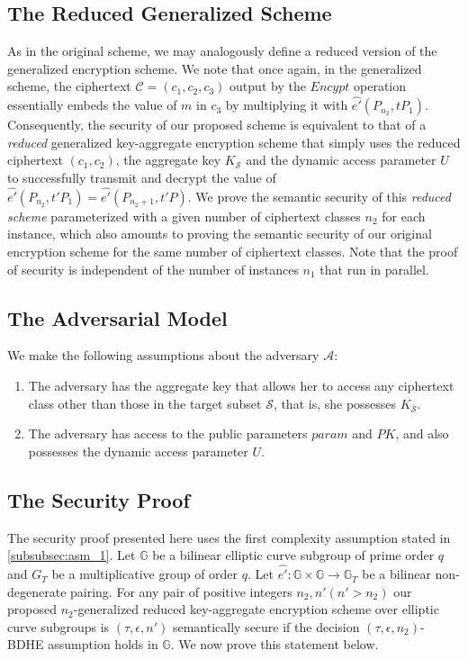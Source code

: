 \subsection{The Reduced Generalized Scheme}

As in the original scheme, we may analogously define a reduced version of the generalized encryption scheme. We note that once again, in the generalized scheme, the ciphertext $\mathcal{C}=(c_1,c_2,c_3)$ output by the $Encypt$ operation essentially embeds the value of $m$ in $c_3$ by multiplying it with $\hat{e'}(P_{n_2},tP_1)$. Consequently, the security of our proposed scheme is equivalent to that of a \emph{reduced} generalized key-aggregate encryption scheme that simply uses the reduced ciphertext $(c_1,c_2)$, the aggregate key $K_{\mathcal{S}}$ and the dynamic access parameter $U$ to successfully transmit and decrypt the value of $\hat{e'}(P_{n_2},t'P_1)=\hat{e'}(P_{n_2+1},t'P)$. We prove the semantic security of this \emph{reduced scheme} parameterized with a given number of ciphertext classes $n_2$ for each instance, which also amounts to proving the semantic security of our original encryption scheme for the same number of ciphertext classes. Note that the proof of security is independent of the 
number of instances $n_1$ that run in parallel.

\subsection{The Adversarial Model} We make the following assumptions about the adversary $\mathcal{A}$:

\begin{enumerate}
 \item The adversary has the aggregate key that allows her to access any ciphertext class other than those in the target subset $\mathcal{S}$, that is, she possesses $K_{\overline{\mathcal{S}}}$.
 \item The adversary has access to the public parameters $param$ and $PK$, and also possesses the dynamic access parameter $U$.
\end{enumerate}


\subsection{The Security Proof}

The security proof presented here uses the first complexity assumption stated in \ref{subsubsec:asm_1}. Let $\mathbb{G}$ be a bilinear elliptic curve subgroup of prime order $q$ and $G_T$ be a multiplicative group of order $q$. Let $\hat{e'}:\mathbb{G} \times \mathbb{G}\longrightarrow\mathbb{G}_T$ be a bilinear non-degenerate pairing. For any pair of positive integers $n_2,n' (n'>n_2)$ our proposed $n_2$-generalized reduced key-aggregate encryption scheme over elliptic curve subgroups is $(\tau,\epsilon,n')$ semantically secure if the decision $(\tau,\epsilon,n_2)$-BDHE assumption holds in $\mathbb{G}$. We now prove this statement below.

